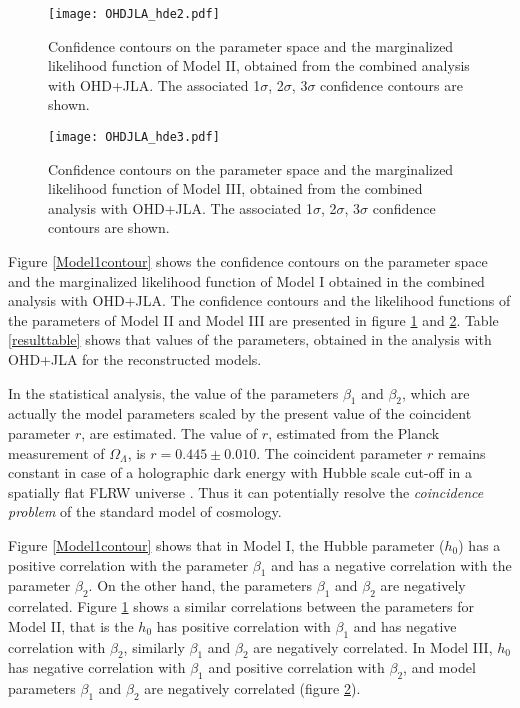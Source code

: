 \documentclass[11pt]{article}
\begin{document}
\begin{figure}[htb]
\begin{center}
\texttt{[image: OHDJLA\_hde2.pdf]}
\end{center}
\caption{{\small Confidence contours on the parameter space and the marginalized likelihood function of Model II, obtained from the combined analysis with OHD+JLA. The associated 1$\sigma$, 2$\sigma$, 3$\sigma$ confidence contours are shown.}}
\label{Model2contour}
\end{figure}



\begin{figure}[htb]
\begin{center}
\texttt{[image: OHDJLA\_hde3.pdf]}
\end{center}
\caption{{\small Confidence contours on the parameter space and the marginalized likelihood function of Model III, obtained from the combined analysis with OHD+JLA. The associated 1$\sigma$, 2$\sigma$, 3$\sigma$ confidence contours are shown.}}
\label{Model3contour}
\end{figure}




Figure \ref{Model1contour} shows the confidence contours on the parameter space and the marginalized likelihood function of Model I obtained in the combined analysis with OHD+JLA. The confidence contours and the likelihood functions of the parameters of Model II and Model III are presented in figure \ref{Model2contour} and \ref{Model3contour}. Table \ref{resulttable} shows that values of the parameters, obtained in the analysis with OHD+JLA for the reconstructed models. 

\par In the statistical analysis, the value of the parameters $\beta_1$ and $\beta_2$, which are actually the model parameters scaled by the present value of the coincident parameter $r$, are estimated. The value of $r$, estimated from the Planck measurement of $\Omega_{\Lambda}$, is $r=0.445\pm 0.010$. The coincident parameter $r$ remains constant in case of a holographic dark energy with Hubble scale cut-off in a spatially flat FLRW universe \cite{senpav}. Thus it can potentially resolve the {\it coincidence problem} of the standard model of cosmology.

\par Figure \ref{Model1contour} shows that in Model I, the Hubble parameter ($h_0$) has a positive correlation with the parameter $\beta_1$ and has a negative correlation with the parameter $\beta_2$. On the other hand, the parameters $\beta_1$ and $\beta_2$ are negatively correlated. Figure \ref{Model2contour} shows a similar correlations between the parameters for Model II, that is the $h_0$ has  positive correlation with $\beta_1$ and has negative correlation with $\beta_2$, similarly $\beta_1$ and $\beta_2$ are negatively correlated.  In Model III, $h_0$ has negative correlation with $\beta_1$ and positive correlation with $\beta_2$, and model parameters $\beta_1$ and $\beta_2$ are negatively correlated (figure \ref{Model3contour}). 
\end{document}
